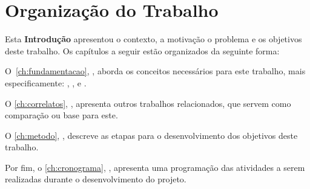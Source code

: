 

\section{Organização do Trabalho}\label{sec:organizacao}
Esta \textbf{Introdução} apresentou o contexto, a motivação o problema e os objetivos deste trabalho. Os capítulos a seguir estão organizados da seguinte forma:

O~\autoref{ch:fundamentacao}, \textbf{}, aborda os conceitos necessários para este trabalho, mais especificamente: , ,  e .

O \autoref{ch:correlatos}, \textbf{}, apresenta outros trabalhos relacionados, que servem como comparação ou base para este.

O \autoref{ch:metodo}, \textbf{}, descreve as etapas para o desenvolvimento dos objetivos deste trabalho.

Por fim, o \autoref{ch:cronograma}, \textbf{}, apresenta uma programação das atividades a serem realizadas durante o desenvolvimento do projeto.

